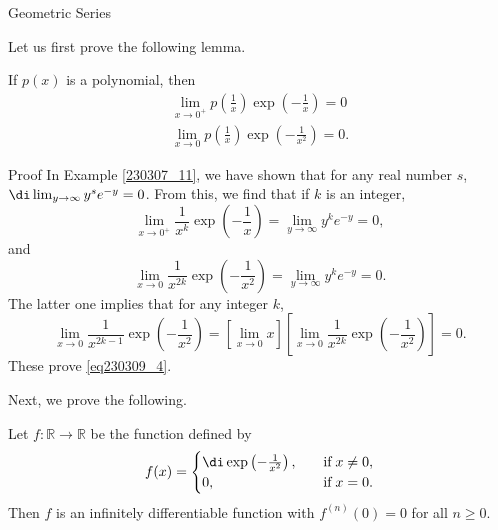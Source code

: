 \begin{example}[label=230305_16]{Geometric Series}
\begin{example}[label=230304_9]{}
\begin{example}{}
\begin{example}{}
Let us first prove the following lemma.
\begin{lemma}[label=230309_6]{}
If $p(x)$ is a polynomial, then
\begin{subequations}\label{eq230309_4}\begin{align}\lim_{x\to 0^+}p\left(\frac{1}{x}\right)\exp\left(-\frac{1}{x}\right)=0 \label{eq230309_4_1}\\
\lim_{x\to 0}p\left(\frac{1}{x}\right)\exp\left(-\frac{1}{x^2}\right)=0.\label{eq230309_4_2}
\end{align}\end{subequations}
\end{lemma}\begin{myproof}{Proof}
In Example \ref{230307_11}, we have shown that for any  real number $s$,
$\di \lim_{y\to \infty}y^s e^{-y}=0$. From this, we find that
 if $k$ is an integer,
\[\lim_{x\to 0^+}\frac{1}{x^k}\exp\left(-\frac{1}{x}\right)=\lim_{y\to \infty}y^ke^{-y}=0,\] and 
\[\lim_{x\to 0}\frac{1}{x^{2k}}\exp\left(-\frac{1}{x^2}\right)=\lim_{y\to \infty}y^ke^{-y}=0.\]
The latter one implies that for any integer $k$,
\[\lim_{x\to 0}\frac{1}{x^{2k-1}}\exp\left(-\frac{1}{x^2}\right)=\left[\lim_{x\to 0}x\right]\left[\lim_{x\to 0}\frac{1}{x^{2k}}\exp\left(-\frac{1}{x^2}\right)\right]=0.\]
These prove \eqref{eq230309_4}.
\end{myproof}

Next, we prove the following.
\begin{theorem}[label=230309_7]{}
Let  $f:\mathbb{R}\to\mathbb{R}$ be the function defined by
\begin{equation}\label{eq230307_12}f(x)=\begin{cases}\di\exp\left(-\frac{1}{x^2}\right),\quad &\text{if}\;x\neq 0,\\0,\quad &\text{if}\;x=0.\end{cases}\end{equation}
Then $f$ is an infinitely differentiable function with $f^{(n)}(0)=0$ for all $n\geq 0$.
\end{theorem}


\end{example}
\end{example}
\end{example}
\end{example}
